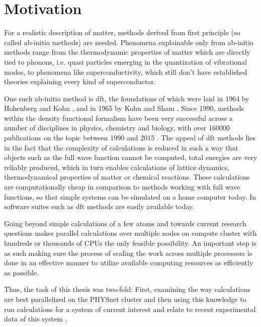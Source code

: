 \documentclass[main.tex]{subfiles}
\begin{document}
\chapter{Motivation}

For a realistic description of matter, methods derived from first principle (so called ab-initio methods) are needed.
Phenomena explainable only from ab-initio methods range from the thermodynamic properties of matter which are directly tied to phonons, i.e. quasi particles emerging in the quantization of vibrational modes, to phenomena like superconductivity, which still don't have established theories explaining every kind of superconductor.

One such ab-initio method is \gls{dft}, the foundations of which were laid in 1964 by Hohenberg and Kohn \cite{hohenberg_inhomogeneous_1964}, and in 1965 by Kohn and Sham \cite{kohn_self-consistent_1965}.
Since 1990, methods within the density functional formalism have been very successful across a number of disciplines in physics, chemistry and biology, with over \num{160000} publications on the topic between 1990 and 2015 \cite{jones_density_2015}.
The appeal of \gls{dft} methods lies in the fact that the complexity of calculations is reduced in such a way that objects such as the full wave function cannot be computed, total energies are very reliably produced, which in turn enables calculations of lattice dynamics, thermodynamical properties of matter or chemical reactions.
These calculations are computationally cheap in comparison to methods working with full wave functions, so that simple systems can be simulated on a home computer today.
In software suites such as \QE \cite{giannozzi_quantum_2009,giannozzi_advanced_2017} \gls{dft} methods are easily available today.

Going beyond simple calculations of a few atoms and towards current research questions makes parallel calculations over multiple nodes on compute cluster with hundreds or thousands of CPUs the only feasible possibility.
An important step is as such making sure the process of scaling the work across multiple processors is done in an effective manner to utilize available computing resources as efficiently as possible.

Thus, the task of this thesis was two-fold:
First, examining the way \QE calculations are best parallelized on the PHYSnet cluster and then using this knowledge to run calculations for a system of current interest and relate to recent experimental data of this system \cite{hall_environmental_2019}.
\end{document}
